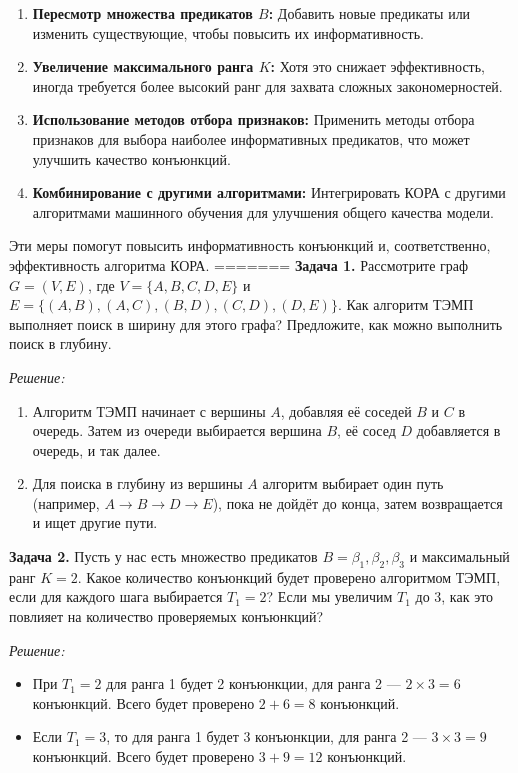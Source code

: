 \begin{itemize}
\begin{enumerate}
    \item \textbf{Пересмотр множества предикатов \( B \):} Добавить новые предикаты или изменить существующие, чтобы повысить их информативность.
    \item \textbf{Увеличение максимального ранга \( K \):} Хотя это снижает эффективность, иногда требуется более высокий ранг для захвата сложных закономерностей.
    \item \textbf{Использование методов отбора признаков:} Применить методы отбора признаков для выбора наиболее информативных предикатов, что может улучшить качество конъюнкций.
    \item \textbf{Комбинирование с другими алгоритмами:} Интегрировать КОРА с другими алгоритмами машинного обучения для улучшения общего качества модели.
\end{enumerate}

Эти меры помогут повысить информативность конъюнкций и, соответственно, эффективность алгоритма КОРА.
=======
    \textbf{Задача 1.}
    \newline
    Рассмотрите граф $G = (V, E)$, где $V = \{A, B, C, D, E\}$ и $E = \{(A, B), (A, C), (B, D), (C, D), (D, E)\}$. Как алгоритм ТЭМП выполняет поиск в ширину для этого графа? Предложите, как можно выполнить поиск в глубину.

\textit{Решение:}
\begin{enumerate}
    \item Алгоритм ТЭМП начинает с вершины $A$, добавляя её соседей $B$ и $C$ в очередь. Затем из очереди выбирается вершина $B$, её сосед $D$ добавляется в очередь, и так далее.
    \item Для поиска в глубину из вершины $A$ алгоритм выбирает один путь (например, $A \to B \to D \to E$), пока не дойдёт до конца, затем возвращается и ищет другие пути.
\end{enumerate}

\textbf{Задача 2.}
\newline
Пусть у нас есть множество предикатов $B = \beta_1, \beta_2, \beta_3$ и максимальный ранг $K = 2$. Какое количество конъюнкций будет проверено алгоритмом ТЭМП, если для каждого шага выбирается $T_1 = 2$? Если мы увеличим $T_1$ до 3, как это повлияет на количество проверяемых конъюнкций?

\textit{Решение:}
\begin{itemize}
    \item При $T_1 = 2$ для ранга 1 будет 2 конъюнкции, для ранга 2 --- $2 \times 3 = 6$ конъюнкций. Всего будет проверено $2 + 6 = 8$ конъюнкций.
    \item Если $T_1 = 3$, то для ранга 1 будет 3 конъюнкции, для ранга 2 --- $3 \times 3 = 9$ конъюнкций. Всего будет проверено $3 + 9 = 12$ конъюнкций.
\end{itemize}


\end{itemize}
